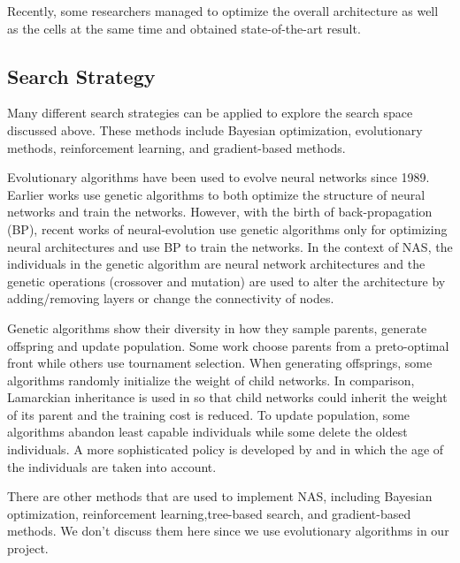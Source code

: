 \documentclass[conference]{IEEEtran}
\begin{document}
  Recently, some researchers managed to optimize the overall architecture as well as the cells at the same time and obtained state-of-the-art result\cite{liu2019auto}.
  
  \subsection{Search Strategy}
  
  Many different search strategies can be applied to explore the search space discussed above. These methods include Bayesian optimization, evolutionary methods, reinforcement learning, and gradient-based methods. 

  Evolutionary algorithms have been used to evolve neural networks since 1989\cite{miller1989designing}. Earlier works use genetic algorithms to both optimize the structure of neural networks and train the networks\cite{stanley2002evolving}. However, with the birth of back-propagation (BP), recent works of neural-evolution use genetic algorithms only for optimizing neural architectures and use BP to train the networks\cite{real2017large}. In the context of NAS, the individuals in the genetic algorithm are neural network architectures and the genetic operations (crossover and mutation) are used to alter the architecture by adding/removing layers or change the connectivity of nodes.

  Genetic algorithms show their diversity in how they sample parents, generate offspring and update population. Some work choose parents from a preto-optimal front\cite{elsken2018efficient} while others use tournament selection\cite{liu2018progressive}\cite{real2018regularized}\cite{real2017large}. When generating offsprings, some algorithms randomly initialize the weight of child networks. In comparison, Lamarckian inheritance is used in \cite{elsken2018efficient} so that child networks could inherit the weight of its parent and the training cost is reduced. To update population, some algorithms abandon least capable individuals\cite{real2017large} while some delete the oldest individuals\cite{real2018regularized}. A more sophisticated policy is developed by \cite{Hornby:2006:AAP:1143997.1144142} and \cite{DBLP:journals/corr/abs-1802-01548} in which the age of the individuals are taken into account.
  
  There are other methods that are used to implement NAS, including Bayesian optimization, reinforcement learning,tree-based search, and gradient-based methods. We don't discuss them here since we use evolutionary algorithms in our project.
\end{document}
